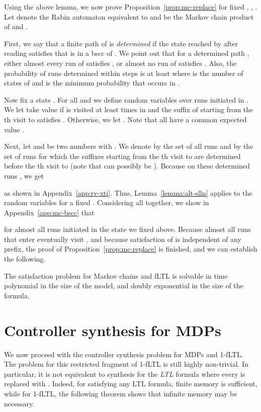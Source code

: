 \documentclass[a4paper,UKenglish]{lipics}
\begin{document}
Using the above lemma, we now prove Proposition~\ref{prop:mc-replace} for fixed , , . Let  denote the Rabin automaton equivalent to  and  be the Markov chain product of  and . 

First, we say that a finite path  of  is \emph{determined} if the state  reached by  after reading  satisfies that  is in a bscc of .
We point out that for a determined path , either almost every run of  satisfies , or almost no run of  satisfies .
Also, the probability of runs determined within  steps is at least
 where  is the number of states of  and  is the minimum probability that occurs in .


Now fix a state .
For all  and 
we define random variables  over runs initiated in . We let  take value  if  is visited at least  times in  and the suffix of  starting from the th visit to  satisfies . Otherwise, we let .
Note that all  have a common expected value .

Next, let  and  be two numbers with .
We denote by  the set of all runs and by  the set of runs  for which the suffixes starting from the th visit to  are determined before the th visit to  (note that  can possibly be ).
Because on these determined runs , we get

as shown in Appendix~\ref{app:rv-xti}. 
Thus, Lemma~\ref{lemma:alt-slln} applies to the random variables  for a fixed .
Considering all  together, we show in Appendix~\ref{app:mc-bscc}
that

for almost all runs initiated in the state  we fixed above.
Because almost all runs that enter  eventually visit , and because satisfaction of   is independent of any prefix,
the proof of Proposition~\ref{prop:mc-replace} is finished, and we can establish the following.

\begin{theorem}
	The satisfaction problem for Markov chains and fLTL is solvable in time polynomial in the size of the model, and doubly exponential in the size of the formula. 
\end{theorem}




\section{Controller synthesis for MDPs}
\label{sec:mdp}

We now proceed with the controller synthesis problem for MDPs  and 1-fLTL. The problem for this restricted fragment of 1-fLTL is still highly non-trivial. In particular, it is not equivalent to synthesis for the \emph{LTL} formula where every  is replaced with . Indeed, for satisfying any LTL formula, finite memory is sufficient, while for 1-fLTL, the following theorem shows that infinite memory may be necessary.
\end{document}
